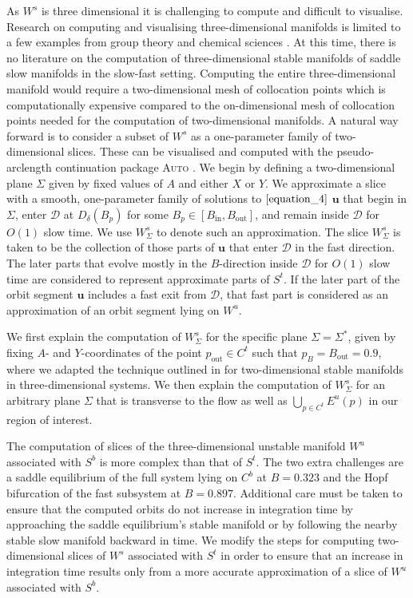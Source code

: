 \documentclass{ws-ijbc}
\begin{document}
As $W^s$ is three dimensional it is challenging to compute and difficult to visualise.  Research on computing and visualising three-dimensional manifolds is limited to a few examples from group theory and chemical sciences \cite{group_theory, chemistry}.  At this time, there is no literature on the computation of three-dimensional stable manifolds of saddle slow manifolds in the slow-fast setting.  Computing the entire three-dimensional manifold would require a two-dimensional mesh of collocation points which is computationally expensive compared to the on-dimensional mesh of collocation points needed for the computation of two-dimensional manifolds. A natural way forward is to consider a subset of $W^s$ as a one-parameter family of two-dimensional slices.  These can be visualised and computed with the pseudo-arclength continuation package \textsc{Auto} \cite{AUTO}.  We begin by defining a two-dimensional plane $\Sigma$ given by fixed values of $A$ and either $X$ or $Y$.  We approximate a slice with a smooth, one-parameter family of solutions to $\ref{equation_4}$ $\mathbf{u}$ that begin in $\Sigma$, enter $\mathscr{D}$ at $D_{\delta}(B_p)$ for some $B_p \in [B_{\text{in}}, B_{\text{out}}]$, and remain inside $\mathscr{D}$ for $O(1)$ slow time.  We use $W^{s}_{\Sigma}$ to denote such an approximation.  The slice $W^{s}_{\Sigma}$ is taken to be the collection of those parts of $\mathbf{u}$ that enter $\mathscr{D}$ in the fast direction.  The later parts that evolve mostly in the $B$-direction inside $\mathscr{D}$ for $O(1)$ slow time are considered to represent approximate parts of $S^t$.  If the later part of the orbit segment $\mathbf{u}$ includes a fast exit from $\mathscr{D}$, that fast part is considered as an approximation of an orbit segment lying on $W^u$.
  
We first explain the computation of $W^s_{\Sigma}$ for the specific plane $\Sigma = \Sigma^*$, given by fixing $A$- and $Y$-coordinates of the point $p_{\text{out}} \in C^t$ such that $p_B=B_{\text{out}}=0.9$, where we adapted the technique outlined in \cite{Saeed_Paper} for two-dimensional stable manifolds in three-dimensional systems.  We then explain the computation of $W^{s}_{\Sigma}$ for an arbitrary plane $\Sigma$ that is transverse to the flow as well as $\bigcup_{p \in C^t} E^u(p)$ in our region of interest.

The computation of slices of the three-dimensional unstable manifold $W^u$ associated with $S^b$ is more complex than that of $S^t$.  The two extra challenges are a saddle equilibrium of the full system lying on $C^b$ at $B = 0.323$ and the Hopf bifurcation of the fast subsystem at $B = 0.897$.  Additional care must be taken to ensure that the computed orbits do not increase in integration time by approaching the saddle equilibrium's stable manifold or by following the nearby stable slow manifold backward in time.  We modify the steps for computing two-dimensional slices of $W^s$ associated with $S^t$ in order to ensure that an increase in integration time results only from a more accurate approximation of a slice of $W^u$ associated with $S^b$.
\end{document}

